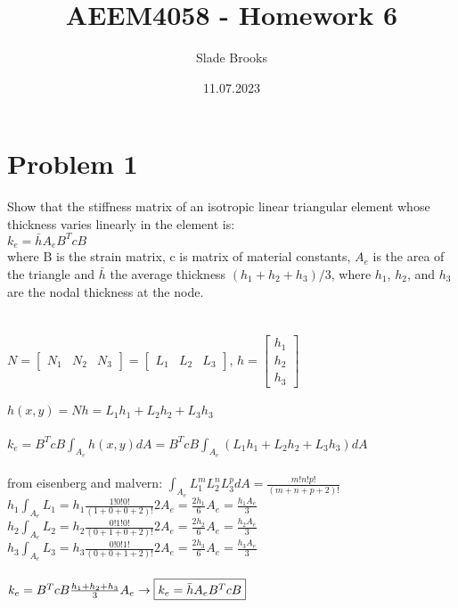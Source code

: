 \documentclass{article}
\title{AEEM4058 - Homework 6}
\author{Slade Brooks}
\date{11.07.2023}
\begin{document}
\maketitle

\section*{Problem 1}
Show that the stiffness matrix of an isotropic linear triangular element whose thickness varies
linearly in the element is: \\
$k_e=\bar{h}A_eB^TcB$ \\
where B is the strain matrix, c is matrix of material constants, $A_e$ is the area of the
triangle and $\bar{h}$ the average thickness $(h_1+h_2+h_3)/3$, where $h_1$, $h_2$, and $h_3$ are
the nodal thickness at the node. \\\\\\
$N=\begin{bmatrix}
    N_1 & N_2 & N_3
\end{bmatrix}=\begin{bmatrix}
    L_1 & L_2 & L_3
\end{bmatrix}$, \quad
$h=\begin{bmatrix}
    h_1 \\ h_2 \\ h_3
\end{bmatrix}$ \\\\
$h(x, y)=Nh=L_1h_1 + L_2h_2 + L_3h_3$ \\\\
$k_e=B^TcB\int_{A_e}h(x,y)dA=B^TcB\int_{A_e}(L_1h_1+L_2h_2+L_3h_3) dA$ \\\\
from eisenberg and malvern: $\int_{A_e}L_1^mL_2^nL_3^p dA=\frac{m!n!p!}{(m+n+p+2)!}$ \\
$h_1\int_{A_e}L_1=h_1\frac{1!0!0!}{(1+0+0+2)!}2A_e=\frac{2h_1}{6}A_e=\frac{h_1A_e}{3}$ \\
$h_2\int_{A_e}L_2=h_2\frac{0!1!0!}{(0+1+0+2)!}2A_e=\frac{2h_2}{6}A_e=\frac{h_2A_e}{3}$ \\
$h_3\int_{A_e}L_3=h_3\frac{0!0!1!}{(0+0+1+2)!}2A_e=\frac{2h_3}{6}A_e=\frac{h_3A_e}{3}$ \\\\
$k_e=B^TcB\frac{h_1+h_2+h_3}{3}A_e \rightarrow \fbox{$k_e=\bar{h}A_eB^TcB$}$
\end{document}
